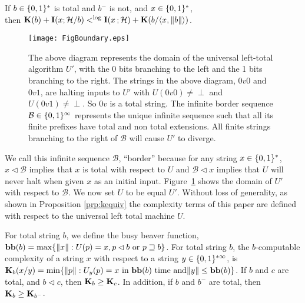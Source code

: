 \documentclass[11pt]{article}\textwidth 6.5in\textheight 9in
\begin{document}
\begin{lmm}
	\label{lmm:totalString}
	If $b\in\{0,1\}^*$ is total and $b^-$ is not, and $x\in\{0,1\}^*$, \\
	then ${\mathbf K}(b)+{\mathbf I}(x;\mathcal{H}/b)<^{\log} {\mathbf I}(x\,{;}\,\mathcal{H})+{\mathbf K}(b/\langle x,\|b\|\rangle)$.
\end{lmm}
\begin{figure}[h!]
	\begin{center}
		\texttt{[image: FigBoundary.eps]}
		\caption{The above diagram represents the domain of the universal left-total algorithm $U'$, with the 0 bits branching to the left and the 1 bits branching to the right. The strings in the above diagram, $0v0$ and $0v1$, are halting inputs to $U'$ with $U(0v0)\neq \perp$ and $U(0v1)\neq \perp$. So $0v$ is a total string. The infinite border sequence $\mathcal{B}\in\{0,1\}^\infty$ represents the unique infinite sequence such that all its finite prefixes have total and non total extensions. All finite strings branching to the right of $\mathcal{B}$ will cause $U'$ to diverge.}
		\label{fig:DomainUPrime}
	\end{center}
\end{figure}

We call this infinite sequence $\mathcal{B}$, ``border'' because for any string $x\in\{0,1\}^*$, $x\lhd\mathcal{B}$ implies that $x$ is total with respect to $U$ and $\mathcal{B}\lhd x$ implies that $U$ will never halt when given $x$ as an initial input. Figure~\ref{fig:DomainUPrime} shows the domain of $U'$ with respect to $\mathcal{B}$. We now set $U$ to be equal $U'$. Without loss of generality, as shown in Proposition \ref{prp:kequiv} the complexity terms of this paper are defined with respect to the universal left total machine $U$.

For total string $b$, we define the busy beaver function, ${\mathbf {bb}}(b)=\max\{\|x\|:U(p)=x, p\lhd b\textrm{ or }p\sqsupseteq b\}$. For total string $b$, the $b$-computable complexity of a string $x$ with respect to a string $y\in\{0,1\}^{*\infty}$, is  ${\mathbf K}_b(x/y)=\min\{\|p\|:U_y(p)=x\textrm{ in ${\mathbf {bb}}(b)$ time and}\|y\|\leq{\mathbf {bb}}(b)\}$. If $b$ and $c$ are total, and $b\lhd c$, then ${\mathbf K}_b\geq {\mathbf K}_c$. In addition, if $b$ and $b^-$ are total, then ${\mathbf K}_b\geq {\mathbf K}_{b^-}$.
\end{document}
